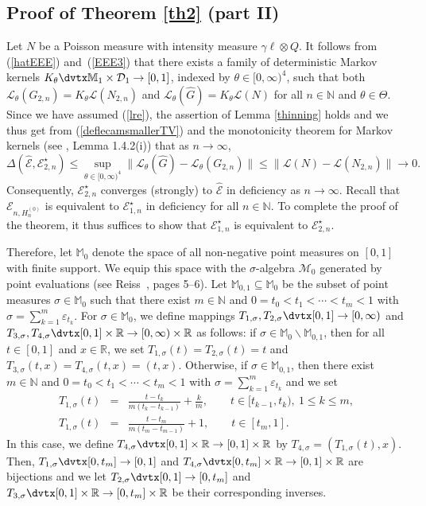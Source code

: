 \documentclass[number,citesort,seceqn,dvips]{arxbj}
\newcommand{\eqref}[1]{(\ref{#1})}
\newcommand{\RR}{\mathbb{R}}
\newcommand{\NN}{\mathbb{N}}
\newcommand{\MM}{\mathbb{M}}
\newcommand{\MMM}{{\mathcal M}}
\newcommand{\DDD}{{\mathcal D}}
\newcommand{\EEE}{{\mathcal E}}
\newcommand{\LLL}{{\mathcal L}}
\begin{document}
\subsection{\texorpdfstring{Proof of Theorem \protect\ref{th2} (part II)}{Proof of Theorem 2.1 (part II)}}\label{SUBSECproofTh2PartII} %
Let $N$ be a Poisson measure with intensity measure $\gamma\ell
\otimes
Q$. It follows from \eqref{hatEEE} and~\eqref{EEE3} that there exists a
family of deterministic Markov kernels
$K_\theta\dvtx\MM_1\times\DDD_1\to[0,1]$, indexed by
$\theta\in[0,\infty)^4$, such that both
$\LLL_\theta(G_{2,n})=K_\theta\LLL(N_{2,n})$ and $\LLL_\theta
(\widehat
G)=K_\theta\LLL(N)$ for all $n\in\NN$ and $\theta\in\Theta$.
Since we
have assumed \eqref{lre}, the assertion of Lemma \ref{thinning} holds
and we thus get from \eqref{deflecamsmallerTV} and the monotonicity
theorem for Markov kernels (see \cite{Re93}, Lemma 1.4.2(i)) that as
$n\to\infty$,
%
\[
\Delta(\widehat\EEE,\EEE^{\star}_{2,n})\le\sup_{\theta\in
[0,\infty)^4}\|
\LLL_\theta(\widehat G)-\LLL_\theta(G_{2,n})\|\le
\|\LLL(N)-\LLL(N_{2,n})\|\to0 .
\]
%
Consequently, $\EEE^{\star}_{2,n}$
converges (strongly) to $\widehat\EEE$ in deficiency as $n\to\infty$.
Recall that $\EEE_{n,H_n^{(0)}}$ is equivalent to $\EEE_{1,n}^{\star}$
in deficiency for all $n\in\NN$. To complete the proof of the theorem,
it thus suffices to show that $\EEE^{\star}_{1,n}$ is equivalent to
$\EEE^{\star}_{2,n}$.

Therefore, let $\MM_0$ denote the space of all non-negative point
measures on $[0,1]$ with finite support. We equip this space with the
$\sigma$-algebra $\MMM_0$ generated by point evaluations (see
Reiss~\cite{Re93}, pages 5--6). Let $\MM_{0,1}\subseteq\MM_0$
be the subset of point measures $\sigma\in\MM_0$ such that there exist
$m\in\NN$ and $0 = t_0 < t_1 < \cdots < t_{m} <  1$ with
$\sigma=\sum_{k=1}^m\varepsilon_{t_k}$. For $\sigma\in\MM_0$, we define
mappings $T_{1,\sigma},T_{2,\sigma}\dvtx[0,1]\to[0,\infty)$ and
$T_{3,\sigma},T_{4,\sigma}\dvtx[0,1]\times\RR\to[0,\infty)\times\RR
$ as
follows: if $\sigma\in\MM_{0}\backslash\MM_{0,1}$, then for all
$t\in[0,1]$ and $x\in\RR$, we set $T_{1,\sigma}(t)=T_{2,\sigma}(t)=t$
and $T_{3,\sigma}(t,x)=T_{4,\sigma}(t,x)=(t,x)$. Otherwise, if
$\sigma\in\MM_{0,1}$, then there exist $m\in\NN$ and
$0 = t_0 < t_1 < \cdots < t_{m} < 1$ with
$\sigma=\sum_{k=1}^m\varepsilon_{t_k}$ and we set
%
\begin{eqnarray*}
T_{1,\sigma}(t)&=& \frac{t-t_k}{m(t_k-t_{k - 1})}+\frac km ,\qquad
t\in[t_{k-1},t_k),\ 1\le k\le m ,\\
\nonumber T_{1,\sigma}(t)&=&\frac{t-t_m}{m(t_m-t_{m - 1})}+
1 ,\qquad t\in[t_{m},1] .
\end{eqnarray*}
%
In this case, we define $T_{4,\sigma}\dvtx[0,1]\times\RR\to[0,1]\times
\RR$
by $T_{4,\sigma}=(T_{1,\sigma}(t),x)$. Then,
$T_{1,\sigma}\dvtx[0,t_m]\to[0,1]$ and
$T_{4,\sigma}\dvtx[0,t_m]\times\RR\to[0,1]\times\RR$ are bijections
and we
let $T_{2,\sigma}\dvtx[0,1]\to[0,t_m]$ and $T_{3,\sigma}\dvtx[0,1]\times
\RR\to[0,t_m]\times\RR$ be their corresponding inverses.
\end{document}
